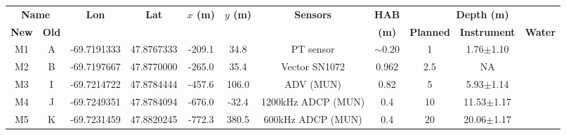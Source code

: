 \documentclass[letterpaper,10pt,landscape]{article}
\begin{document}
\thispagestyle{empty}

  \begin{table}
    \centering
    \begin{tabular}{|c|c|c|c|c|c|c|c|c|c|c|}
      \hline
      \multicolumn{2}{|c|}{{\bf Name}}         & {\bf Lon}                    & {\bf Lat}                   & {\bf $x$ (m)}             & {\bf $y$ (m)}           & {\bf Sensors}      & {\bf HAB}  & \multicolumn{3}{|c|}{{\bf Depth (m)}} \\
      {\bf New}           & {\bf Old}          &                              &                             &                           &                         &                    & {\bf (m)}  & {\bf Planned}       & {\bf Instrument}  & {\bf Water} \\
                                                                                                                                                                                                                          
      \hline \hline                                                                                                                                                                                                       
                                                                                                                                                                                                                          
      M1                  & A                  & -69.7191333                  & 47.8767333                  & -209.1                    & 34.8                    & PT sensor          & $\sim0.20$ & 1                   & 1.76$\pm$1.10     & \\ \hline
      M2                  & B                  & -69.7197667                  & 47.8770000                  & -265.0                    & 35.4                    & Vector SN1072      & 0.962      & 2.5                 & NA                & \\ \hline
      M3                  & I                  & -69.7214722                  & 47.8784444                  & -457.6                    & 106.0                   & ADV (MUN)          & 0.82       & 5                   & 5.93$\pm$1.14     & \\ \hline
      M4                  & J                  & -69.7249351                  & 47.8784094                  & -676.0                    & -32.4                   & 1200kHz ADCP (MUN) & 0.4        & 10                  & 11.53$\pm$1.17    & \\ \hline
      M5                  & K                  & -69.7231459                  & 47.8820245                  & -772.3                    & 380.5                   & 600kHz ADCP (MUN)  & 0.4        & 20                  & 20.06$\pm$1.17    & \\ \hline
                                                                                                                                                                                                                          

\end{tabular}
\end{table}
\end{document}
